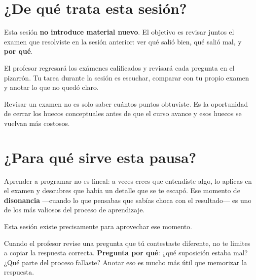 \documentclass[12pt, oneside]{article}
\begin{document}

\tableofcontents
\newpage

\section{¿De qué trata esta sesión?}

Esta sesión \textbf{no introduce material nuevo}.
El objetivo es revisar juntos el examen que resolviste en la sesión anterior:
ver qué salió bien, qué salió mal, y \textbf{por qué}.

El profesor regresará los exámenes calificados y revisará cada pregunta
en el pizarrón.  Tu tarea durante la sesión es escuchar, comparar con tu
propio examen y anotar lo que no quedó claro.

\begin{recuerda}
  Revisar un examen no es solo saber cuántos puntos obtuviste.
  Es la oportunidad de cerrar los huecos conceptuales antes de que el curso
  avance y esos huecos se vuelvan más costosos.
\end{recuerda}

\section{¿Para qué sirve esta pausa?}

Aprender a programar no es lineal: a veces crees que entendiste algo,
lo aplicas en el examen y descubres que había un detalle que se te escapó.
Ese momento de \textbf{disonancia} —cuando lo que pensabas que sabías choca
con el resultado— es uno de los más valiosos del proceso de aprendizaje.

Esta sesión existe precisamente para aprovechar ese momento.

\begin{consejo}
  Cuando el profesor revise una pregunta que tú contestaste diferente,
  no te limites a copiar la respuesta correcta.
  \textbf{Pregunta por qué}: ¿qué suposición estaba mal?
  ¿Qué parte del proceso fallaste?
  Anotar eso es mucho más útil que memorizar la respuesta.
\end{consejo}
\end{document}
